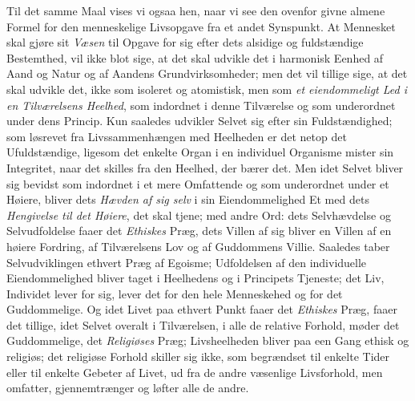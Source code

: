\documentclass[12pt,a4paper,openany]{book}
\newcommand{\opage}[1]{\marginnote{\footnotesize\textit{[#1]}}}
\begin{document}
Til det samme Maal vises vi ogsaa hen, naar vi see
den ovenfor givne almene Formel for den menneskelige Livsopgave
fra et andet Synspunkt. At Mennesket skal gjøre
sit \emph{Væsen} til Opgave for sig efter dets alsidige og fuldstændige
Bestemthed, vil ikke blot sige, at det skal udvikle det
i harmonisk Eenhed af Aand og Natur og af Aandens Grundvirksomheder;
men det vil tillige sige, at det skal udvikle
det, ikke som isoleret og atomistisk, men som \emph{et eiendommeligt
Led i en Tilværelsens Heelhed}, som indordnet i
denne Tilværelse og som underordnet under dens Princip.
Kun saaledes udvikler Selvet sig efter sin Fuldstændighed;
som løsrevet fra Livssammenhængen med Heelheden er det
netop det Ufuldstændige, ligesom det enkelte Organ i en
individuel Organisme mister sin Integritet, naar det skilles
fra den Heelhed, der bærer det. Men idet Selvet bliver sig
bevidst som indordnet i et mere Omfattende og som underordnet
under et Høiere, bliver dets \emph{Hævden af sig selv} i
\opage{504}sin Eiendommelighed Et med dets \emph{Hengivelse til det
Høiere}, det skal tjene; med andre Ord: dets Selvhævdelse
og Selvudfoldelse faaer det \emph{Ethiskes} Præg, dets Villen
af sig bliver en Villen af en høiere Fordring, af Tilværelsens
Lov og af Guddommens Villie. Saaledes taber Selvudviklingen
ethvert Præg af Egoisme; Udfoldelsen af den
individuelle Eiendommelighed bliver taget i Heelhedens og i
Principets Tjeneste; det Liv, Individet lever for sig, lever
det for den hele Menneskehed og for det Guddommelige.
Og idet Livet paa ethvert Punkt faaer det \emph{Ethiskes} Præg,
faaer det tillige, idet Selvet overalt i Tilværelsen, i alle de
relative Forhold, møder det Guddommelige, det \emph{Religiøses}
Præg; Livsheelheden bliver paa een Gang ethisk og religiøs;
det religiøse Forhold skiller sig ikke, som begrændset til enkelte
Tider eller til enkelte Gebeter af Livet, ud fra de andre
væsenlige Livsforhold, men omfatter, gjennemtrænger og
løfter alle de andre.
\end{document}
